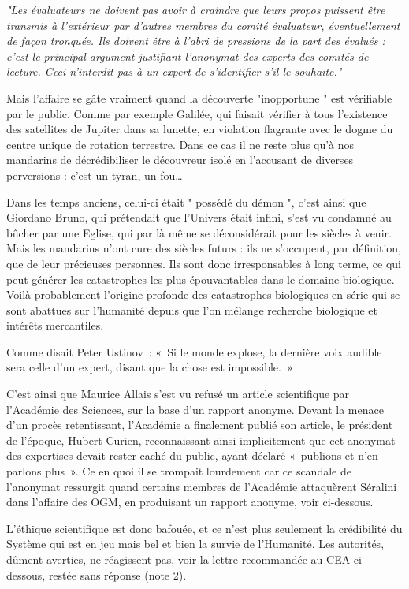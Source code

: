 \documentclass[a4paper,12pt]{article}
\begin{document}
\textit{"Les évaluateurs ne doivent pas avoir à craindre que leurs propos puissent être transmis à l'extérieur par d'autres membres du comité évaluateur, éventuellement de façon tronquée. Ils doivent être à l'abri de pressions de la part des évalués : c'est le principal argument justifiant l'anonymat des experts des comités de lecture. Ceci n'interdit pas à un expert de s'identifier s'il le souhaite."} 


Mais l’affaire se gâte vraiment quand la découverte "inopportune " est vérifiable par le public. Comme par exemple Galilée, qui faisait vérifier à tous l’existence des satellites de Jupiter dans sa lunette, en violation flagrante avec le dogme du centre unique de rotation terrestre. Dans ce cas il ne reste plus qu’à nos mandarins de décrédibiliser le découvreur isolé en l’accusant de diverses perversions : c’est un tyran, un fou… 

Dans les temps anciens, celui-ci était " possédé du démon ", c’est ainsi que Giordano Bruno, qui prétendait que l’Univers était infini, s’est vu condamné au bûcher par une Eglise, qui par là même se déconsidérait pour les siècles à venir. Mais les mandarins n’ont cure des siècles futurs : ils ne s’occupent, par définition, que de leur précieuses personnes. Ils sont donc irresponsables à long terme, ce qui peut générer les catastrophes les plus épouvantables dans le domaine biologique. Voilà probablement l’origine profonde des catastrophes biologiques en série qui se sont abattues sur l’humanité depuis que l’on mélange recherche biologique et intérêts mercantiles.

Comme disait Peter Ustinov : « Si le monde explose, la dernière voix audible sera celle d'un expert, disant que la chose est impossible. » 

C’est ainsi que Maurice Allais s’est vu refusé un article scientifique par l’Académie des Sciences, sur la base d’un rapport anonyme.  Devant la menace d’un procès retentissant, l'Académie a finalement publié son article, le président de l’époque, Hubert Curien, reconnaissant ainsi implicitement que cet anonymat des expertises devait rester caché du public,  ayant déclaré « publions et n’en parlons plus ». Ce en quoi il se trompait lourdement car ce scandale de l’anonymat ressurgit quand certains membres de l’Académie attaquèrent Séralini dans l’affaire des OGM, en produisant un rapport anonyme, voir ci-dessous. 


L’éthique scientifique est donc bafouée, et ce n’est plus seulement la crédibilité du Système qui est en jeu mais bel et bien la survie de l’Humanité. Les autorités, dûment averties, ne réagissent pas, voir la lettre recommandée au CEA ci-dessous, restée sans réponse (note 2).
\end{document}
